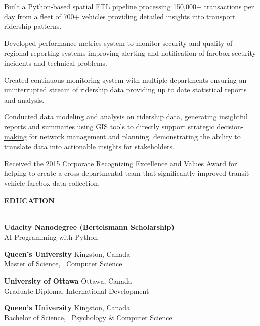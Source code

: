 \documentclass[letterpaper]{article}
\newcommand{\lineunder} {
        \vspace*{-8pt} \\
        \hspace*{-18pt} \hrulefill \\
    }
\newcommand{\header} [1] {
        \vspace{9pt}
        {\hspace*{-18pt}\vspace*{6pt} \large \textbf {#1}}
        \vspace*{-6pt} \lineunder
        \vspace{2pt}
    }
\newenvironment{jobtasklist}
        {
            \vspace{-12pt}
            \begin{itemize} \itemsep 0pt
        }{
            \end{itemize}
            \vspace{-3pt}
        }
\newcommand{\university}[3]{
        \textbf{#1}  %
        \hfill #2\\  %
        #3\\         %
        \vspace{2mm}
    }
\newcommand{\impt}[1]{\uline{#1}}
\begin{document}
\begin{jobtasklist}
{        \item Built a Python-based spatial ETL pipeline
                \impt{processing 150,000+ transactions per day} from a fleet of 700+ vehicles
                providing detailed insights into transport ridership patterns.

        \item Developed performance metrics system to monitor security and quality
                of regional reporting systems improving alerting and notification of
                farebox security incidents and technical problems.

        \item Created continuous monitoring system with multiple departments
                ensuring an uninterrupted stream of ridership data
                providing up to date statistical reports and analysis.

        \item Conducted data modeling and analysis on ridership data, generating insightful reports and summaries
                using GIS tools to \impt{directly support strategic decision-making} for network management and planning,
                demonstrating the ability to translate data into actionable insights for stakeholders.

%
        \item Received the 2015 Corporate Recognizing \impt{Excellence and Values} Award
                for helping to create a cross-departmental team that significantly
                improved transit vehicle farebox data collection.
    }


\end{jobtasklist}



\header{EDUCATION}
    \university
        {Udacity Nanodegree (Bertelsmann Scholarship)}
        {}
        {AI Programming with Python}
    \university
        {Queen's University}
        {Kingston, Canada}
        {Master of Science, ~Computer Science}

    \university
        {University of Ottawa}
        {Ottawa, Canada}
        {Graduate Diploma, International Development}

    \university
        {Queen's University}
        {Kingston, Canada}
        {Bachelor of Science, ~Psychology \& Computer Science}
\end{document}
